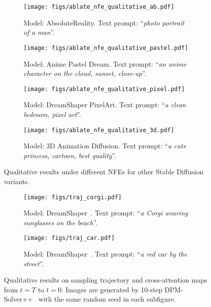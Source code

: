 \begin{figure}[t]
\begin{center}
    \begin{subfigure}[t]{0.9\textwidth}
        \texttt{[image: figs/ablate\_nfe\_qualitative\_ab.pdf]}
        \caption{Model: AbsoluteReality. Text prompt: ``\textit{photo portrait of a man}''.}
    \end{subfigure}
    \vskip 0.15in
    \begin{subfigure}[t]{0.9\textwidth}
        \texttt{[image: figs/ablate\_nfe\_qualitative\_pastel.pdf]}
        \caption{Model: Anime Pastel Dream. Text prompt: ``\textit{an anime character on the cloud, sunset, close-up}''.}
    \end{subfigure}
    \vskip 0.15in
    \begin{subfigure}[t]{0.9\textwidth}
        \texttt{[image: figs/ablate\_nfe\_qualitative\_pixel.pdf]}
        \caption{Model: DreamShaper PixelArt. Text prompt: ``\textit{a clean bedroom, pixel art}''.}
    \end{subfigure}
    \vskip 0.15in
    \begin{subfigure}[t]{0.9\textwidth}
        \texttt{[image: figs/ablate\_nfe\_qualitative\_3d.pdf]}
        \caption{Model: 3D Animation Diffusion. Text prompt: ``\textit{a cute princess, cartoon, best quality}''.}
    \end{subfigure}
\caption{Qualitative results under different NFEs for other Stable Diffusion variants.}
\label{fig:ablate_nfe_qualitative_variants}
\end{center}
\end{figure}


\begin{figure}[t]
\begin{center}
    \begin{subfigure}[t]{\textwidth}
        \texttt{[image: figs/traj\_corgi.pdf]}
        \caption{Model: DreamShaper~\cite{DreamShaper}. Text prompt: ``\textit{a Corgi wearing sunglasses on the beach}''.}
    \end{subfigure}
    \vskip 0.15in
    \begin{subfigure}[t]{\textwidth}
        \texttt{[image: figs/traj\_car.pdf]}
        \caption{Model: DreamShaper~\cite{DreamShaper}. Text prompt: ``\textit{a red car by the street}''.}
    \end{subfigure}
\caption{Qualitative results on sampling trajectory and cross-attention maps from $t=T$ to $t=0$. Images are generated by 10-step DPM-Solver++~\cite{lu2022dpmpp} with the same random seed in each subfigure.}
\label{fig:traj}
\end{center}
\end{figure}